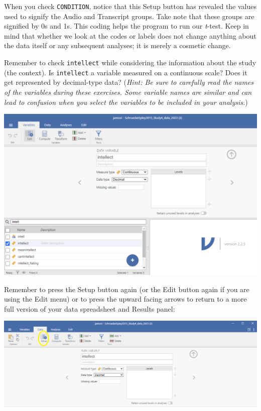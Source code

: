 \documentclass[
]{book}
\begin{document}
When you check \texttt{CONDITION}, notice that this {Setup} button has revealed the values used to signify the Audio and Transcript groups. Take note that these groups are signified by 0s and 1s. This coding helps the program to run our \emph{t}-test. Keep in mind that whether we look at the codes or labels does not change anything about the data itself or any subsequent analyses; it is merely a cosmetic change.

Remember to check \texttt{intellect} while considering the information about the study (the context). Is \texttt{intellect} a variable measured on a continuous scale? Does it get represented by decimal-type data? (\emph{Hint: Be sure to carefully read the names of the variables during these exercises. Some variable names are similar and can lead to confusion when you select the variables to be included in your analysis.})

\includegraphics{img/VariableAttributesForIntellVariable.png}

Remember to press the {Setup} button again (or the {Edit} button again if you are using the {Edit} menu) or to press the upward facing arrows to return to a more full version of your data spreadsheet and Results panel:

\includegraphics{img/ClosingVariableAttributesWindow1.png}
\end{document}
